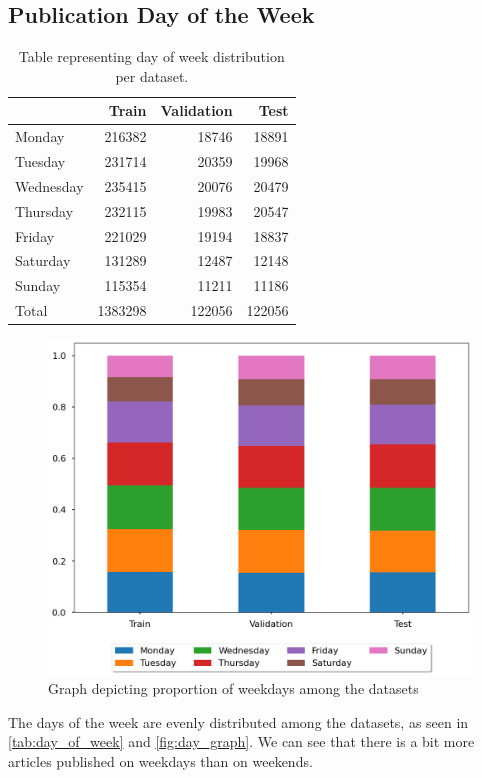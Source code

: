 \subsection{Publication Day of the Week}
\begin{table}[h]
    \centering\footnotesize\sf
    \begin{tabular}{lrrr}
        \toprule
        {}        & Train   & Validation & Test   \\
        \midrule
        Monday    & 216382  & 18746      & 18891  \\
        Tuesday   & 231714  & 20359      & 19968  \\
        Wednesday & 235415  & 20076      & 20479  \\
        Thursday  & 232115  & 19983      & 20547  \\
        Friday    & 221029  & 19194      & 18837  \\
        Saturday  & 131289  & 12487      & 12148  \\
        Sunday    & 115354  & 11211      & 11186  \\
        \midrule
        Total     & 1383298 & 122056     & 122056 \\
        \bottomrule
    \end{tabular}
    \caption{Table representing day of week distribution per dataset.}
    \label{tab:day_of_week}
\end{table}
\begin{figure}[h]
    \centering
    \includegraphics[width=.6\linewidth]{img/tasks_graph/day_of_week.png}
    \caption{Graph depicting proportion of weekdays among the datasets}
    \label{fig:day_graph}
\end{figure}
The days of the week are evenly distributed among the datasets, as seen in \autoref{tab:day_of_week} and \autoref{fig:day_graph}.
We can see that there is a bit more articles published on weekdays than on weekends.

